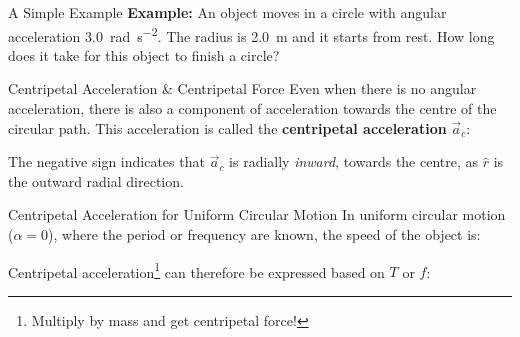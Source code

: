 \documentclass[12pt,compress,aspectratio=169]{beamer}
\begin{document}
\begin{frame}{A Simple Example}
  \textbf{Example:} An object moves in a circle with angular acceleration
  \SI{3.0}{\radian\per\second\squared}. The radius is \SI{2.0}{\metre} and it
  starts from rest. How long does it take for this object to finish a circle?
\end{frame}



\begin{frame}{Centripetal Acceleration \& Centripetal Force}
  Even when there is no angular acceleration, there is also a component of
  acceleration towards the centre of the circular path. This acceleration is
  called the \textbf{centripetal acceleration} $\vec a_c$:


  The negative sign indicates that $\vec a_c$ is radially \emph{inward}, towards
  the centre, as $\hat r$ is the outward radial direction.
\end{frame}



\begin{frame}{Centripetal Acceleration for Uniform Circular Motion}
  In uniform circular motion ($\alpha=0$), where the period or frequency are
  known, the speed of the object is:


  Centripetal acceleration\footnote{Multiply by mass and get centripetal
  force!} can therefore be expressed based on $T$ or $f$:

\end{frame}
\end{document}

